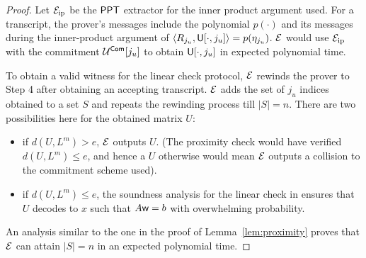 \begin{proof}
	Let $\mathcal{E}_{\mathrm{ip}}$ be the $\mathsf{PPT}$ extractor for the inner product argument used. For a transcript, the prover's messages include the polynomial $p(\cdot)$ and its messages during the inner-product argument of $\langle R_{j_u},\mathsf{U}[\cdot,j_u]\rangle = p(\eta_{j_u})$.
	$\mathcal{E}$ would use $\mathcal{E}_{\mathrm{ip}}$ with the commitment $\mathcal{U}^{\mathsf{Com}}[j_u]$ to obtain $\mathsf{U}[\cdot,j_u]$ in expected polynomial time. 
	
	To obtain a valid witness for the linear check protocol, $\mathcal{E}$ rewinds the prover to Step 4 after obtaining an accepting transcript. $\mathcal{E}$ adds the set of $j_u$ indices obtained to a set $S$ and repeats the rewinding process till $|S| = n$. 
	There are two possibilities here for the obtained matrix $U$:
	\begin{itemize}
		\item if $d(U, L^m) > e$, $\mathcal{E}$ outputs $U$. (The proximity check would have verified $d(U,L^m) \leq e$, and hence a $U$ otherwise would mean $\mathcal{E}$ outputs a collision to the commitment scheme used).
		\item if $d(U, L^m) \leq e$, the soundness analysis for the linear check in \cite{ligero} ensures that $U$ decodes to $x$ such that $A\mathsf{w}=b$ with overwhelming probability. %
	\end{itemize}
	An analysis similar to the one in the proof of Lemma~\ref{lem:proximity} proves that $\mathcal{E}$ can attain $|S| = n$ in an expected polynomial time.
\end{proof}
\begin{comment}
\subsubsection{Quadratic Check}
The quadratic check involves the prover convincing the verifier that $x\circ y=z$ by providing oracle access to the vectors $x,y$ and $z$. Again, we
consider the encoding by parts we discussed for the linear check. We write $x=(x_1|\cdots|x_m)$, $y=(y_1|\cdots|y_m)$ and $z=(z_1|\cdots|z_m)$ and
construct polynomials $\hat{f}^x_i$, $\hat{f}^y_i$ and $\hat{f}^z_i$ for $i\in [m]$ as before. The quadratic check then reduces to showing that
$\hat{f}^x_i(\zeta) \cdot \hat{f}^y_i(\zeta)-\hat{f}^z_i(\zeta)=0$ for all $i\in [m]$ and $\zeta\in G$. With high probability, the above can be checked by
verifier sending a random vector $r\sample \bbF^m$ to the prover, and prover sending the polynomial $\hat{p}=\sum_{i\in [m] } r_i (\hat{f}^x_i \cdot \hat{f}^y_i - \hat{f}^z_i)$ to the verifier. The verifier checks that $\hat{p}(\zeta)=0$ for all $\zeta\in G$. The verifier also checks that $\hat{p}$ is correctly computed from the oracles by querying the oracles at small number of points $\eta_1,\ldots,\eta_q$ and checking that $\hat{p}(\eta_j)=\sum_{i\in [m]}r_i(\hat{f}^x_i(\eta_j)\cdot\hat{f}^y_i(\eta_j)-\hat{f}^z_i(\eta_j))$ for $j\in [q]$.
\end{comment}

